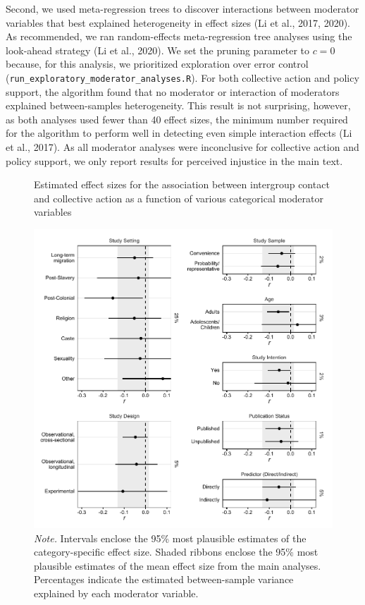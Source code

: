 \documentclass[12pt, letterpaper]{article}
\begin{document}
Second, we used meta-regression trees to discover interactions between
moderator variables that best explained heterogeneity in effect sizes
(Li et al., 2017, 2020). As recommended, we ran random-effects
meta-regression tree analyses using the look-ahead strategy (Li et al.,
2020). We set the pruning parameter to \(c = 0\) because, for this
analysis, we prioritized exploration over error control
(\texttt{run\_exploratory\_moderator\_analyses.R}). For both collective
action and policy support, the algorithm found that no moderator or
interaction of moderators explained between-samples heterogeneity. This
result is not surprising, however, as both analyses used fewer than 40
effect sizes, the minimum number required for the algorithm to perform
well in detecting even simple interaction effects (Li et al., 2017). As
all moderator analyses were inconclusive for collective action and
policy support, we only report results for perceived injustice in the
main text.

\begin{figure}
\centering
\caption{Estimated effect sizes for the association between intergroup contact and collective action as a function of various categorical moderator variables}
\includegraphics[scale=1]{../figures/figure-s1}
\caption*{\textit{Note.} Intervals enclose the 95\% most plausible estimates of the category-specific effect size. Shaded ribbons enclose the 95\% most plausible estimates of the mean effect size from the main analyses. Percentages indicate the estimated between-sample variance explained by each moderator variable.}
\label{fig:s1}
\end{figure}
\end{document}
